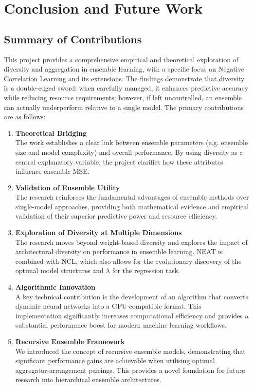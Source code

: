 \section{Conclusion and Future Work}
\label{sec:conclusion}


\subsection{Summary of Contributions}
This project provides a comprehensive empirical and theoretical exploration of diversity and aggregation in ensemble learning, with a specific focus on Negative Correlation Learning and its extensions. The findings demonstrate that diversity is a double-edged sword: when carefully managed, it enhances predictive accuracy while reducing resource requirements; however, if left uncontrolled, an ensemble can actually underperform relative to a single model. The primary contributions are as follows: 
\begin{enumerate}
    \item \textbf{Theoretical Bridging} \\
    The work establishes a clear link between ensemble parameters (e.g. ensemble size and model complexity) and overall performance. By using diversity as a central explanatory variable, the project clarifies how these attributes influence ensemble MSE. 

    \item \textbf{Validation of Ensemble Utility} \\
    The research reinforces the fundamental advantages of ensemble methods over single-model approaches, providing both mathematical evidence and empirical validation of their superior predictive power and resource efficiency. 

    \item \textbf{Exploration of Diversity at Multiple Dimensions} \\
    The research moves beyond weight-based diversity and explores the impact of architectural diversity on performance in ensemble learning. NEAT is combined with NCL, which also allows for the evolutionary discovery of the optimal model structures and $\lambda$ for the regression task. 

    \item \textbf{Algorithmic Innovation} \\
    A key technical contribution is the development of an algorithm that converts dynamic neural networks into a GPU-compatible format. This implementation significantly increases computational efficiency and provides a substantial performance boost for modern machine learning workflows. 

    \item \textbf{Recursive Ensemble Framework} \\
    We introduced the concept of recursive ensemble models, demonstrating that significant performance gains are achievable when utilising optimal aggregator-arrangement pairings. This provides a novel foundation for future research into hierarchical ensemble architectures. 
\end{enumerate}


